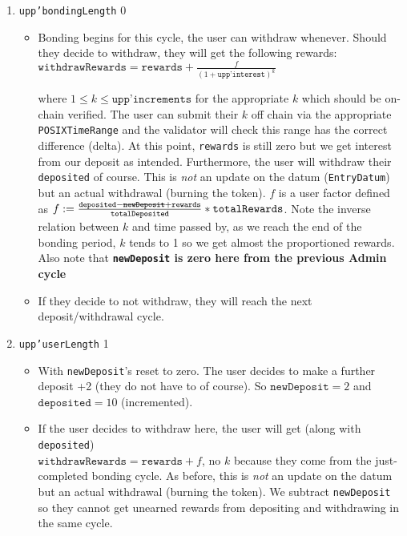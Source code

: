\documentclass[10pt, a4paper]{article}
\theoremstyle{definition}
\begin{document}
\begin{enumerate}
{\begin{itemize}
\end{itemize}
}

\item{\texttt{upp'bondingLength} 0
\begin{itemize}
\item{Bonding begins for this cycle, the user can withdraw whenever. Should they decide to withdraw, they will get the following rewards: \\ $\texttt{withdrawRewards} = \texttt{rewards} + \frac{f}{(1 + \texttt{upp'interest})^k}$

 where $1 \leq k \leq \texttt{upp'increments}$
for the appropriate $k$ which should be on-chain verified. The user can submit their $k$ off chain via the appropriate \texttt{POSIXTimeRange} and the validator will check this range has the correct difference (delta). At this point, \texttt{rewards} is still zero but we get interest from our deposit as intended. Furthermore, the user will withdraw their \texttt{deposited} of course. This is \textit{not} an update on the datum (\texttt{EntryDatum}) but an actual withdrawal (burning the token). $f$ is a user factor defined as $f := \frac{\texttt{deposited} - \st{\texttt{newDeposit}} + \texttt{rewards}}{\texttt{totalDeposited}} * \texttt{totalRewards}$. Note the inverse relation between $k$ and time passed by, as we reach the end of the bonding period, $k$ tends to 1 so we get almost the proportioned rewards. Also note that \textbf{\texttt{newDeposit} is zero here from the previous Admin cycle}}
\item{If they decide to not withdraw, they will reach the next deposit/withdrawal cycle.}
\end{itemize}
}

\item{\texttt{upp'userLength} 1
\begin{itemize}
\item{With \texttt{newDeposit}'s reset to zero. The user decides to make a further deposit +2 (they do not have to of course). So $\texttt{newDeposit}=2$ and $\texttt{deposited}=10$ (incremented).}
\item{If the user decides to withdraw here, the user will get (along with \texttt{deposited}) \\ $\texttt{withdrawRewards} = \texttt{rewards} +  f$, no $k$ because they come from the just-completed  bonding cycle. As before, this is \textit{not} an update on the datum but an actual withdrawal (burning the token). We subtract \texttt{newDeposit} so they cannot get unearned rewards from depositing and withdrawing in the same cycle.

}
\end{itemize}}
\end{enumerate}
\end{document}
